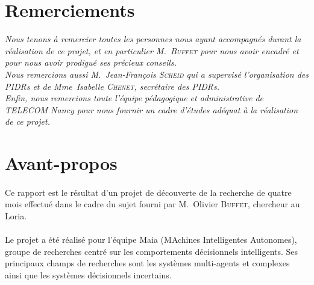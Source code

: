 \documentclass[pidr]{tnreport}
\begin{document}
  
\maketitle
{}


\clearpage
\makesecondtitle

\section*{Remerciements}

{\em
Nous tenons à remercier toutes les personnes nous ayant accompagnés durant la réalisation de ce projet, et en particulier M.~\textsc{Buffet} pour nous avoir encadré et pour nous avoir prodigué ses précieux conseils. \\
Nous remercions aussi M.~Jean-François \textsc{Scheid} qui a supervisé l'organisation des PIDRs et de Mme~Isabelle \textsc{Chenet}, secrétaire des PIDRs. \\
Enfin, nous remercions toute l'équipe pédagogique et administrative de TELECOM Nancy pour nous fournir un cadre d'études adéquat à la réalisation de ce projet. \\
}

\clearpage

\section*{Avant-propos}
\paragraph{}
Ce rapport est le résultat d'un projet de découverte de la recherche de quatre mois effectué dans le cadre du sujet fourni par M.~Olivier \textsc{Buffet}, chercheur au Loria.

\paragraph{}
Le projet a été réalisé pour l'équipe Maia (MAchines Intelligentes Autonomes), groupe de recherches centré sur les comportements décisionnels intelligents. Ses principaux champs de recherches sont les systèmes multi-agents et complexes ainsi que les systèmes décisionnels incertains.
\end{document}

